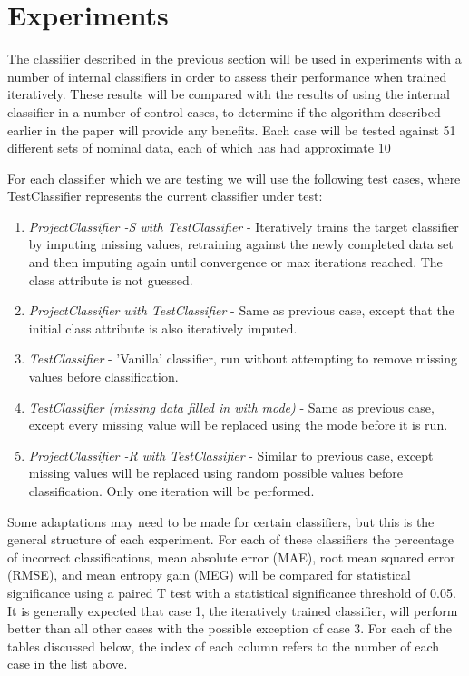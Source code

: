 \newpage
\chapter{Experiments}
The classifier described in the previous section will be used in experiments with a number of internal classifiers in order to assess their performance when trained iteratively. These results will be compared with the results of using the internal classifier in a number of control cases, to determine if the algorithm described earlier in the paper will provide any benefits. Each case will be tested against 51 different sets of nominal data, each of which has had approximate 10%

For each classifier which we are testing we will use the following test cases, where TestClassifier represents the current classifier under test:

\begin{enumerate}
\item \textit{ProjectClassifier -S with TestClassifier} - Iteratively trains the target classifier by imputing missing values, retraining against the newly completed data set and then imputing again until convergence or max iterations reached. The class attribute is not guessed.
\item \textit{ProjectClassifier with TestClassifier} - Same as previous case, except that the initial class attribute is also iteratively imputed.
\item \textit{TestClassifier} - 'Vanilla' classifier, run without attempting to remove missing values before classification.
\item \textit{TestClassifier (missing data filled in with mode)} - Same as previous case, except every missing value will be replaced using the mode before it is run.
\item \textit{ProjectClassifier -R with TestClassifier} - Similar to previous case, except missing values will be replaced using random possible values before classification. Only one iteration will be performed.
\end{enumerate}

Some adaptations may need to be made for certain classifiers, but this is the general structure of each experiment. For each of these classifiers the percentage of incorrect classifications, mean absolute error (MAE), root mean squared error (RMSE), and mean entropy gain (MEG) will be compared for statistical significance using a paired T test with a statistical significance threshold of 0.05. It is generally expected that case 1, the iteratively trained classifier, will perform better than all other cases with the possible exception of case 3. For each of the tables discussed below, the index of each column refers to the number of each case in the list above.

